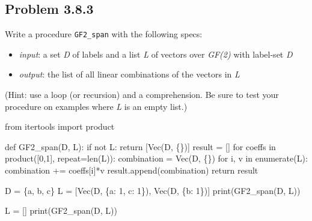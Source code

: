 \documentclass[
  letterpaper,
  DIV=11,
  numbers=noendperiod]{scrartcl}
\newenvironment{Shaded}{\begin{snugshade}}{\end{snugshade}}
\newcommand{\BuiltInTok}[1]{\textcolor[rgb]{0.00,0.23,0.31}{#1}}
\newcommand{\ControlFlowTok}[1]{\textcolor[rgb]{0.00,0.23,0.31}{#1}}
\newcommand{\DecValTok}[1]{\textcolor[rgb]{0.68,0.00,0.00}{#1}}
\newcommand{\ImportTok}[1]{\textcolor[rgb]{0.00,0.46,0.62}{#1}}
\newcommand{\KeywordTok}[1]{\textcolor[rgb]{0.00,0.23,0.31}{#1}}
\newcommand{\NormalTok}[1]{\textcolor[rgb]{0.00,0.23,0.31}{#1}}
\newcommand{\OperatorTok}[1]{\textcolor[rgb]{0.37,0.37,0.37}{#1}}
\newcommand{\StringTok}[1]{\textcolor[rgb]{0.13,0.47,0.30}{#1}}
\providecommand{\tightlist}{%
  \setlength{\itemsep}{0pt}\setlength{\parskip}{0pt}}\usepackage{longtable,booktabs,array}
\begin{document}
\newpage{}

\hypertarget{problem-3.8.3}{%
\subsection{Problem 3.8.3}\label{problem-3.8.3}}

Write a procedure \texttt{GF2\_span} with the following specs:

\begin{itemize}
\tightlist
\item
  \emph{input}: a set \emph{D} of labels and a list \emph{L} of vectors
  over \emph{GF(2)} with label-set \emph{D}
\item
  \emph{output}: the list of all linear combinations of the vectors in
  \emph{L}
\end{itemize}

(Hint: use a loop (or recursion) and a comprehension. Be sure to test
your procedure on examples where \emph{L} is an empty list.)

\begin{Shaded}
\begin{Highlighting}[numbers=left,,]
\ImportTok{from}\NormalTok{ itertools }\ImportTok{import}\NormalTok{ product}

\KeywordTok{def}\NormalTok{ GF2\_span(D, L):}
    \ControlFlowTok{if} \KeywordTok{not}\NormalTok{ L:}
        \ControlFlowTok{return}\NormalTok{ [Vec(D, \{\})]}
\NormalTok{    result }\OperatorTok{=}\NormalTok{ []}
    \ControlFlowTok{for}\NormalTok{ coeffs }\KeywordTok{in}\NormalTok{ product([}\DecValTok{0}\NormalTok{,}\DecValTok{1}\NormalTok{], repeat}\OperatorTok{=}\BuiltInTok{len}\NormalTok{(L)):}
\NormalTok{        combination }\OperatorTok{=}\NormalTok{ Vec(D, \{\})}
        \ControlFlowTok{for}\NormalTok{ i, v }\KeywordTok{in} \BuiltInTok{enumerate}\NormalTok{(L):}
\NormalTok{            combination }\OperatorTok{+=}\NormalTok{ coeffs[i]}\OperatorTok{*}\NormalTok{v}
\NormalTok{        result.append(combination)}
    \ControlFlowTok{return}\NormalTok{ result}

\NormalTok{D }\OperatorTok{=}\NormalTok{ \{}\StringTok{\textquotesingle{}a\textquotesingle{}}\NormalTok{, }\StringTok{\textquotesingle{}b\textquotesingle{}}\NormalTok{, }\StringTok{\textquotesingle{}c\textquotesingle{}}\NormalTok{\}}
\NormalTok{L }\OperatorTok{=}\NormalTok{ [Vec(D, \{}\StringTok{\textquotesingle{}a\textquotesingle{}}\NormalTok{: }\DecValTok{1}\NormalTok{, }\StringTok{\textquotesingle{}c\textquotesingle{}}\NormalTok{: }\DecValTok{1}\NormalTok{\}), Vec(D, \{}\StringTok{\textquotesingle{}b\textquotesingle{}}\NormalTok{: }\DecValTok{1}\NormalTok{\})]}
\BuiltInTok{print}\NormalTok{(GF2\_span(D, L))}

\NormalTok{L }\OperatorTok{=}\NormalTok{ []}
\BuiltInTok{print}\NormalTok{(GF2\_span(D, L))}
\end{Highlighting}
\end{Shaded}
\end{document}
